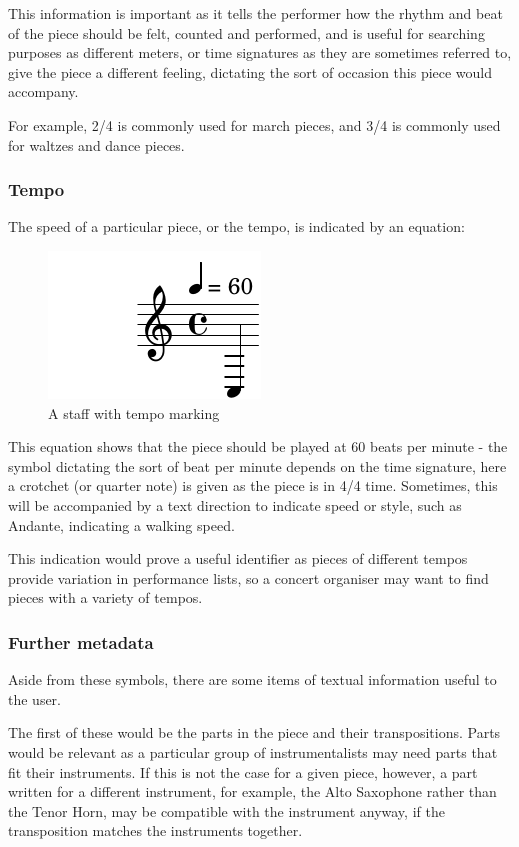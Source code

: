 This information is important as it tells the performer how the rhythm and beat of the piece should be felt, counted and performed, and is useful for searching purposes as different meters, or time signatures as they are sometimes referred to, give the piece a different feeling, dictating the sort of occasion this piece would accompany. 

For example, 2/4 is commonly used for march pieces, and 3/4 is commonly used for waltzes and dance pieces.

\subsubsection{Tempo}
The speed of a particular piece, or the tempo, is indicated by an equation:

\begin{figure}[htbp]
    \centering
        \includegraphics{tempo-crop.pdf}
    \caption{A staff with tempo marking}
\end{figure}

This equation shows that the piece should be played at 60 beats per minute - the symbol dictating the sort of beat per minute depends on the time signature, here a crotchet (or quarter note) is given as the piece is in 4/4 time. Sometimes, this will be accompanied by a text direction to indicate speed or style, such as Andante, indicating a walking speed.

This indication would prove a useful identifier as pieces of different tempos provide variation in performance lists, so a concert organiser may want to find pieces with a variety of tempos.

\subsubsection{Further metadata}
Aside from these symbols, there are some items of textual information useful to the user. 

The first of these would be the parts in the piece and their transpositions. Parts would be relevant as a particular group of instrumentalists may need parts that fit their instruments. If this is not the case for a given piece, however, a part written for a different instrument, for example, the Alto Saxophone rather than the Tenor Horn, may be compatible with the instrument anyway, if the transposition matches the instruments together. 

